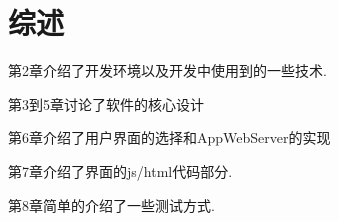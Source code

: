 \chapter{综述}
第2章介绍了开发环境以及开发中使用到的一些技术.

第3到5章讨论了软件的核心设计

第6章介绍了用户界面的选择和AppWebServer的实现

第7章介绍了界面的js/html代码部分.

第8章简单的介绍了一些测试方式.
